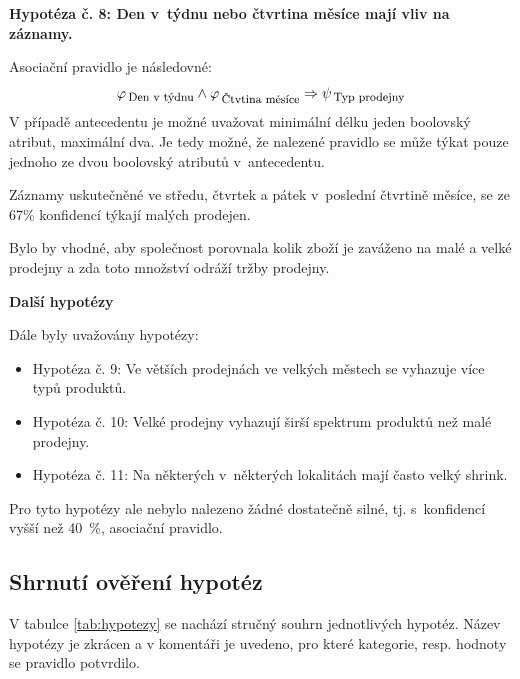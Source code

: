\textbf{Hypotéza č. 8: Den v~týdnu nebo čtvrtina měsíce mají vliv na záznamy.}

Asociační pravidlo je následovné:
\begin{equation}
    \varphi_{\mbox{\,{\footnotesize Den v~týdnu}}} \land  \varphi_{\mbox{\,{\footnotesize Čtvtina měsíce}}} \Rightarrow \psi_{\mbox{\,{\footnotesize Typ prodejny}}}
\end{equation} 
V případě antecedentu je možné uvažovat minimální délku jeden boolovský atribut, maximální dva. Je tedy možné, že nalezené pravidlo se může týkat pouze jednoho ze dvou boolovský atributů v~antecedentu.

Záznamy uskutečněné ve středu, čtvrtek a pátek v~poslední čtvrtině měsíce, se ze 67\% konfidencí týkají malých prodejen.

Bylo by vhodné, aby společnost porovnala kolik zboží je zaváženo na malé a velké prodejny a zda toto množství odráží tržby prodejny.

\textbf{Další hypotézy}

Dále byly uvažovány hypotézy:
\begin{itemize}
    \itemsep 0em
    \item Hypotéza č. 9: Ve větších prodejnách ve velkých městech se vyhazuje více typů produktů.
    \item Hypotéza č. 10: Velké prodejny vyhazují širší spektrum produktů než malé prodejny.
    \item Hypotéza č. 11: Na některých v~některých lokalitách mají často velký shrink.
\end{itemize}

Pro tyto hypotézy ale nebylo nalezeno žádné dostatečně silné, tj. s~konfidencí vyšší než 40~\%, asociační pravidlo.

\subsection*{Shrnutí ověření hypotéz}

V tabulce \ref*{tab:hypotezy} se nachází stručný souhrn jednotlivých hypotéz. Název hypotézy je zkrácen a v komentáři je uvedeno, pro které kategorie, resp. hodnoty se pravidlo potvrdilo.  

